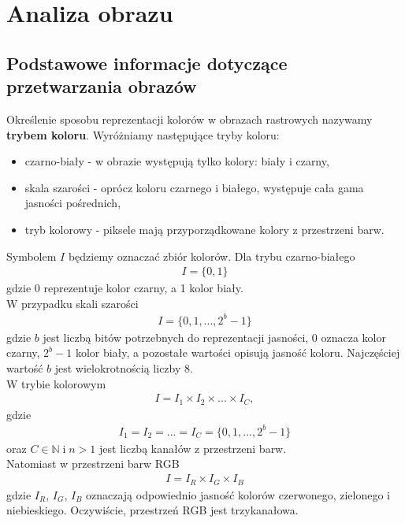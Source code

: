 \section{Analiza obrazu}
\subsection{Podstawowe informacje dotyczące przetwarzania obrazów}
Określenie sposobu reprezentacji kolorów w obrazach rastrowych nazywamy \textbf{trybem koloru}. Wyróżniamy następujące tryby koloru:
\begin{itemize}
  \item czarno-biały - w obrazie występują tylko kolory: biały i czarny,
  \item skala szarości - oprócz koloru czarnego i białego, występuje cała gama jasności pośrednich,
  \item tryb kolorowy - piksele mają przyporządkowane kolory z przestrzeni barw.
\end{itemize}
Symbolem $I$ będziemy oznaczać zbiór kolorów. Dla trybu czarno-białego
\begin{gather*}
  I = \{0, 1\}
\end{gather*} gdzie 0 reprezentuje kolor czarny, a 1 kolor biały.\\
W przypadku skali szarości
\begin{gather*}
  I = \{0, 1, ..., 2^b-1\}
\end{gather*}
gdzie $b$ jest liczbą bitów potrzebnych do reprezentacji jasności, 0 oznacza kolor czarny, $2^b-1$ kolor biały, a pozostałe wartości opisują jasność koloru. Najczęściej wartość $b$ jest wielokrotnością liczby 8.\\
W trybie kolorowym
\begin{gather*}
  I = I_1 \times I_2 \times ... \times I_C,
\end{gather*}
gdzie
\begin{gather*}
  I_1 = I_2 = ... = I_C = \{0, 1, ..., 2^b-1\}
\end{gather*}
oraz $C \in \mathbb{N} \; \text{i} \; n > 1$ jest liczbą kanałów z przestrzeni barw. \\
Natomiast w przestrzeni barw RGB
\begin{gather*}
  I = I_R \times I_G \times I_B
\end{gather*}
gdzie $I_R$, $I_G$, $I_B$ oznaczają odpowiednio jasność kolorów czerwonego, zielonego i niebieskiego. Oczywiście, przestrzeń RGB jest trzykanałowa.
\\
